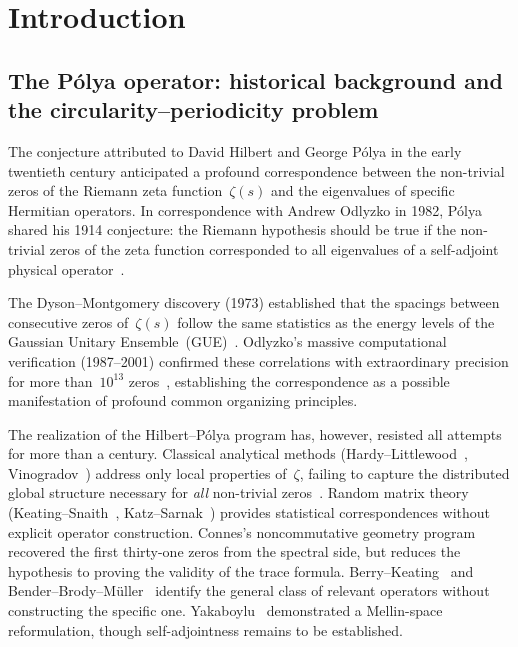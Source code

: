 \section{Introduction}\label{sec:intro}

\subsection{The P\'olya operator: historical background and the circularity--\allowbreak periodicity problem}\label{ssec:polya-hist}

The conjecture attributed to David Hilbert and George P\'olya in the
early twentieth century anticipated a profound correspondence between the
non-trivial zeros of the Riemann zeta function~$\zeta(s)$ and the
eigenvalues of specific Hermitian operators.  In correspondence with
Andrew Odlyzko in 1982, P\'olya shared his 1914 conjecture: the Riemann
hypothesis should be true if the non-trivial zeros of the zeta function
corresponded to all eigenvalues of a self-adjoint physical
operator~\cite{polya1982letter,odlyzko87}.

The Dyson--Montgomery discovery (1973) established that the spacings
between consecutive zeros of~$\zeta(s)$ follow the same statistics as the
energy levels of the Gaussian Unitary Ensemble~(GUE)~\cite{dyson62,
montgomery73,Mitra2000QuantumFT}.  Odlyzko's massive computational verification
(1987--2001) confirmed these correlations with extraordinary precision for
more than~$10^{13}$ zeros~\cite{odlyzko01}, establishing the
correspondence as a possible manifestation of profound common organizing
principles.

The realization of the Hilbert--P\'olya program has, however, resisted
all attempts for more than a century.  Classical analytical methods
(Hardy--Littlewood~\cite{hardy14}, Vinogradov~\cite{vinogradov47})
address only local properties of~$\zeta$, failing to capture the
distributed global structure necessary for \emph{all} non-trivial
zeros~\cite{titchmarsh86}.  Random matrix theory
(Keating--Snaith~\cite{keating00}, Katz--Sarnak~\cite{katz99}) provides
statistical correspondences without explicit operator construction.
Connes's noncommutative geometry program~\cite{connes99,connes95}
recovered the first thirty-one zeros from the spectral side, but reduces
the hypothesis to proving the validity of the trace formula.
Berry--Keating~\cite{berry99} and
Bender--Brody--M\"uller~\cite{bender17} identify the general class of
relevant operators without constructing the specific one.
Yakaboylu~\cite{yakaboylu24} demonstrated a Mellin-space reformulation,
though self-adjointness remains to be established.

